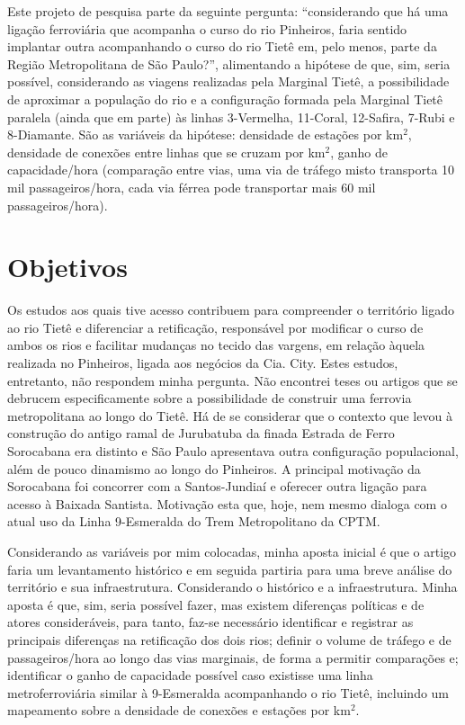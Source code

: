 \documentclass[
	12pt,				%
	openright,			%
	oneside,
	a4paper,			%
	english,			%
	french,				%
	spanish,			%
	brazil,				%
	]{abntex2}
\begin{document}
Este projeto de pesquisa parte da seguinte pergunta: ``considerando que há uma ligação ferroviária que acompanha o curso do rio Pinheiros, faria sentido implantar outra acompanhando o curso do rio Tietê em, pelo menos, parte da Região Metropolitana de São Paulo?'', alimentando a hipótese de que, sim, seria possível, considerando as viagens realizadas pela Marginal Tietê, a possibilidade de aproximar a população do rio e a configuração formada pela Marginal Tietê paralela (ainda que em parte) às linhas 3-Vermelha, 11-Coral, 12-Safira, 7-Rubi e 8-Diamante. São as variáveis da hipótese: densidade de estações por km$^{2}$, densidade de conexões entre linhas que se cruzam por km$^{2}$, ganho de capacidade/hora (comparação entre vias, uma via de tráfego misto transporta 10 mil passageiros/hora, cada via férrea pode transportar mais 60 mil passageiros/hora).



\chapter{Objetivos}

Os estudos aos quais tive acesso contribuem para compreender o território ligado ao rio Tietê e diferenciar a retificação, responsável por modificar o curso de ambos os rios e facilitar mudanças no tecido das vargens, em relação àquela realizada no Pinheiros, ligada aos negócios da Cia. City. Estes estudos, entretanto, não respondem minha pergunta. Não encontrei teses ou artigos que se debrucem especificamente sobre a possibilidade de construir uma ferrovia metropolitana ao longo do Tietê. Há de se considerar que o contexto que levou à construção do antigo ramal de Jurubatuba da finada Estrada de Ferro Sorocabana era distinto e São Paulo apresentava outra configuração populacional, além de pouco dinamismo ao longo do Pinheiros. A principal motivação da Sorocabana foi concorrer com a Santos-Jundiaí e oferecer outra ligação para acesso à Baixada Santista. Motivação esta que, hoje, nem mesmo dialoga com o atual uso da Linha 9-Esmeralda do Trem Metropolitano da CPTM.

Considerando as variáveis por mim colocadas, minha aposta inicial é que o artigo faria um levantamento histórico e em seguida partiria para uma breve análise do território e sua infraestrutura. Considerando o histórico e a infraestrutura. Minha aposta é que, sim, seria possível fazer, mas existem diferenças políticas e de atores consideráveis, para tanto, faz-se necessário identificar e registrar as principais diferenças na retificação dos dois rios; definir o volume de tráfego e de passageiros/hora ao longo das vias marginais, de forma a permitir comparações e; identificar o ganho de capacidade possível caso existisse uma linha metroferroviária similar à 9-Esmeralda acompanhando o rio Tietê, incluindo um mapeamento sobre a densidade de conexões e estações por km$^{2}$.
\end{document}
